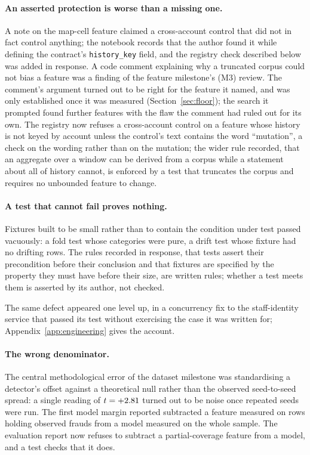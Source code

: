 \paragraph{An asserted protection is worse than a missing one.} A note on the map-cell feature
claimed a cross-account control that did not in fact control anything; the notebook records that the
author found it while defining the contract's \texttt{history\_key} field, and the registry check
described below was added in response. A code comment explaining why a truncated corpus could not
bias a feature was a finding of the feature milestone's (M3) review. The
comment's argument turned out to be right for the feature it named, and was only established once it
was measured (Section~\ref{sec:floor}); the search it prompted found \nFurtherFeatures{} further
features with the flaw the comment had ruled out for its own. The registry now refuses a
cross-account control on a feature whose history is not keyed by account unless the control's text
contains the word ``mutation'', a check on the wording rather than on the mutation; the wider rule recorded, that an aggregate over a window can
be derived from a corpus while a statement about all of history cannot, is enforced by a test that
truncates the corpus and requires no unbounded feature to change.

\paragraph{A test that cannot fail proves nothing.} Fixtures built to be small rather than to
contain the condition under test passed vacuously: a fold test whose categories were pure, a drift
test whose fixture had no drifting rows. The rules recorded in response, that tests assert their
precondition before their conclusion and that fixtures are specified by the property they must have
before their size, are written rules; whether a test meets them is asserted by its author, not
checked.

The same defect appeared one level up, in a concurrency fix to the staff-identity service that
passed its test without exercising the case it was written for; Appendix~\ref{app:engineering}
gives the account.

\paragraph{The wrong denominator.} The central methodological error of the dataset milestone was
standardising a detector's offset against a theoretical null rather than the observed seed-to-seed
spread: a single reading of $t = +2.81$ turned out to be noise once repeated seeds were run.
The first model margin reported subtracted a feature measured on \nMarginRows{} rows holding
\nMarginFraud{} observed frauds from a model measured on the whole sample. The evaluation report now
refuses to subtract a partial-coverage feature from a model, and a test checks that it does.

